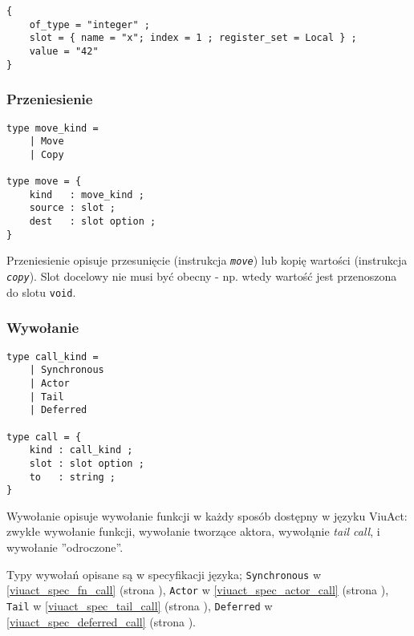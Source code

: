 \begin{small}
\begin{lstlisting}
{
    of_type = "integer" ;
    slot = { name = "x"; index = 1 ; register_set = Local } ;
    value = "42"
}
\end{lstlisting}
\end{small}

\subsubsection{Przeniesienie}
\label{diagram_klas_przeniesienie}

\begin{small}
\begin{lstlisting}
type move_kind =
    | Move
    | Copy

type move = {
    kind   : move_kind ;
    source : slot ;
    dest   : slot option ;
}
\end{lstlisting}
\end{small}

Przeniesienie opisuje przesunięcie (instrukcja \emph{\texttt{move}}) lub kopię wartości (instrukcja
\emph{\texttt{copy}}). Slot docelowy nie musi być obecny - np. wtedy wartość jest przenoszona do slotu
\texttt{void}.

\subsubsection{Wywołanie}
\label{diagram_klas_wywolanie}

\begin{small}
\begin{lstlisting}
type call_kind =
    | Synchronous
    | Actor
    | Tail
    | Deferred

type call = {
    kind : call_kind ;
    slot : slot option ;
    to   : string ;
}
\end{lstlisting}
\end{small}

Wywołanie opisuje wywołanie funkcji w każdy sposób dostępny w języku ViuAct: zwykłe wywołanie funkcji,
wywołanie tworzące aktora, wywołąnie \emph{tail call}, i wywołanie ''odroczone''.

Typy wywołań opisane są w specyfikacji języka;
\texttt{Synchronous} w \ref{viuact_spec_fn_call} (strona \pageref{viuact_spec_fn_call}),
\texttt{Actor} w \ref{viuact_spec_actor_call} (strona \pageref{viuact_spec_actor_call}),
\texttt{Tail} w \ref{viuact_spec_tail_call} (strona \pageref{viuact_spec_tail_call}),
\texttt{Deferred} w \ref{viuact_spec_deferred_call} (strona \pageref{viuact_spec_deferred_call}).

